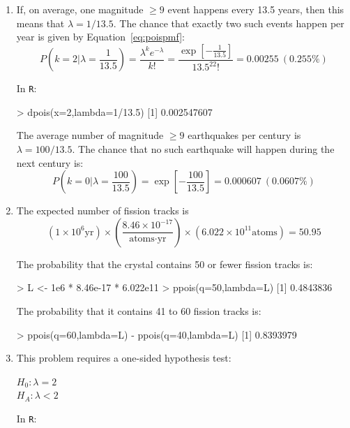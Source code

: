 \begin{enumerate}
\item If, on average, one magnitude $\geq{9}$ event happens every 13.5
  years, then this means that $\lambda=1/13.5$. The chance that
  exactly two such events happen per year is given by
  Equation~\ref{eq:poispmf}:
  \[
  P\left(k=2|\lambda=\frac{1}{13.5}\right) = \frac{\lambda^k
    e^{-\lambda}}{k!} = \frac{\exp\left[-\frac{1}{13.5}\right]}{13.5^22!} =
  0.00255 ~ (0.255\%)
  \]

  In \texttt{R}:

\begin{console}
> dpois(x=2,lambda=1/13.5)
[1] 0.002547607
\end{console}

The average number of magnitude $\geq{9}$ earthquakes per century is
$\lambda={100/13.5}$. The chance that no such earthquake will happen
during the next century is:
  \[
  P\left(k=0|\lambda=\frac{100}{13.5}\right) =
  \exp\left[{-\frac{100}{13.5}}\right] =
  0.000607 ~ (0.0607\%)
  \]

\item The expected number of fission tracks is
  \[
  (1\times{10}^{6}\mbox{yr})
  \times
  \left(\frac{{8.46}\times{10}^{-17}}{\mbox{atoms}\cdot\mbox{yr}}\right)
  \times({6.022}\times{10}^{11}\mbox{atoms})=50.95
  \]

  The probability that the crystal contains 50 or fewer fission tracks
  is:

\begin{console}
> L <- 1e6 * 8.46e-17 * 6.022e11
> ppois(q=50,lambda=L)
[1] 0.4843836
\end{console}

The probability that it contains 41 to 60 fission tracks is:

\begin{console}
> ppois(q=60,lambda=L) - ppois(q=40,lambda=L)
[1] 0.8393979
\end{console}

\item This problem requires a one-sided hypothesis test:

  $H_0: \lambda=2$\\
  $H_{\!A}: \lambda<2$

  In \texttt{R}:



\end{enumerate}
